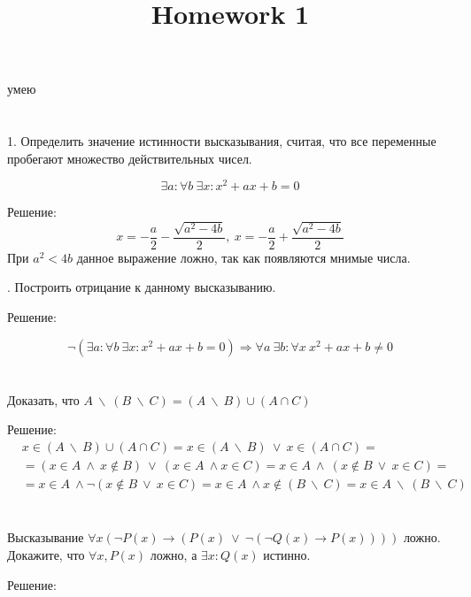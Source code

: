 \documentclass[a4paper, fontsize=12pt]{article} %
\title{Homework 1}
\date{}
\begin{document}
    \maketitle

    \section{}

    умею

    \section{\normalsize \normalfont }

    1. Определить значение истинности высказывания, считая, что все переменные
    пробегают множество действительных чисел.

    $$\exists a : \forall b \  \exists x : x^2 + ax + b = 0$$ \smallskip

    Решение:
    $$x = - \frac{a}{2} - \frac{\sqrt{a^{2} - 4 b}}{2}, \  x = - \frac{a}{2} + \frac{\sqrt{a^{2} - 4 b}}{2}$$\smallskip
    При $a^2 < 4b$ данное выражение ложно, так как появляются мнимые числа.

    \smallskip
    . Построить отрицание к данному высказыванию. \bigskip

    Решение:

    $$\lnot (\exists a : \forall b \  \exists x : x^2 + ax + b = 0) \Longrightarrow \forall
    a \ \exists b : \forall x \ x^2 + ax + b \neq 0$$

    
    \section{}
    Доказать, что $A \  \backslash \  (B \ \backslash \  C) = (A \ \backslash \ B) \cup (A \cap C)$

    Решение:
    \begin{align*}
        &x \in (A \ \backslash \ B) \cup (A \cap C) = x \in (A \ \backslash \ B) \ \vee \ x \in (A \cap C) =\\
        &=(x \in A \ \wedge \ x \notin B) \ \vee \ (x \in A \ \wedge x \in C) = x \in A \  \wedge \ (x \notin 
        B \ \vee \ x \in C) =\\
        &= x \in A \ \wedge \lnot  (x \notin B \ \vee \ x \in C) = x \in A \ \wedge x \notin (B \ \backslash \ C) =
        x \in A \ \backslash \ (B \ \backslash \ C)
    \end{align*}

    \section{}
    Высказывание $\forall x(\lnot P(x) \rightarrow (P(x) \ \vee \ \lnot(\lnot Q(x) \rightarrow P(x))))$ ложно. Докажите, что 
    $\forall x, P(x)$ ложно, а $\exists x : Q(x)$ истинно.

    Решение:


    
\end{document}
